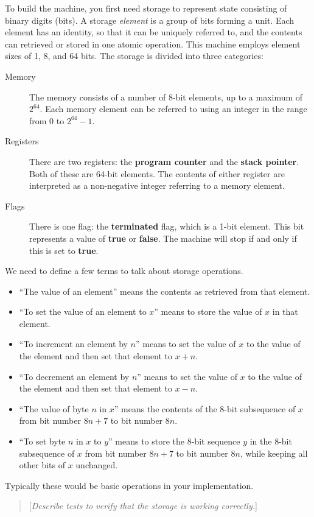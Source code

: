 \documentclass[a4paper,11pt]{article}
\newcommand{\PC}{\textbf{program counter}\xspace}
\newcommand{\SP}{\textbf{stack pointer}\xspace}
\newcommand{\TERM}{\textbf{terminated}\xspace}
\newcommand{\F}{\textbf{false}\xspace}
\newcommand{\T}{\textbf{true}\xspace}
\newcommand{\comment}[1]{\begin{quote}[\textit{#1}]\end{quote}}
\begin{document}
To build the machine, you first need storage to represent state consisting of binary digits (bits).
A storage \emph{element} is a group of bits forming a unit.
Each element has an identity, so that it can be uniquely referred to, and the contents can retrieved or stored in one atomic operation.
This machine employs element sizes of 1, 8, and 64 bits.
The storage is divided into three categories:
\begin{description}
\item[Memory] 
The memory consists of a number of 8-bit elements, up to a maximum of $2^{64}$.
Each memory element can be referred to using an integer in the range from $0$ to $2^{64} - 1$.
\item[Registers] 
There are two registers: the \PC and the \SP.
Both of these are 64-bit elements.
The contents of either register are interpreted as a non-negative integer referring to a memory element.
\item[Flags] 
There is one flag: the \TERM flag, which is a 1-bit element.
This bit represents a value of \T or \F.
The machine will stop if and only if this is set to \T.
\end{description}
We need to define a few terms to talk about storage operations.
\begin{itemize}
\item ``The value of an element'' means the contents as retrieved from that element.
\item ``To set the value of an element to $x$'' means to store the value of $x$ in that element.
\item ``To increment an element by $n$'' means to set the value of $x$ to the value of the element and then set that element to $x + n$.
\item ``To decrement an element by $n$'' means to set the value of $x$ to the value of the element and then set that element to $x - n$.
\item ``The value of byte $n$ in $x$'' means the contents of the 8-bit subsequence of $x$ from bit number $8n+7$ to bit number $8n$.
\item ``To set byte $n$ in $x$ to $y$'' means to store the 8-bit sequence $y$ in the 8-bit subsequence of $x$ from bit number $8n+7$ to bit number $8n$, while keeping all other bits of $x$ unchanged.
\end{itemize}
Typically these would be basic operations in your implementation.

\comment{Describe tests to verify that the storage is working correctly.}
\end{document}
